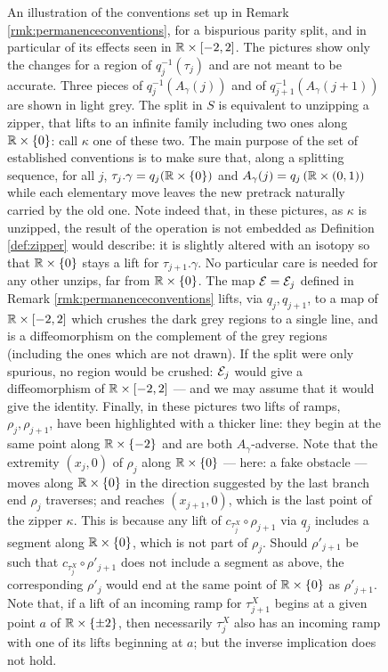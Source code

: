 \begin{rmk}
\begin{figure}
\centering
\def\svgwidth{\textwidth}

\caption{\label{fig:permanenceconventions} An illustration of the conventions set up in Remark \ref{rmk:permanenceconventions}, for a bispurious parity split, and in particular of its effects seen in $\mathbb R\times[-2,2]$. The pictures show only the changes for a region of $q_j^{-1}(\tau_j)$ and are not meant to be accurate. Three pieces of $q_j^{-1}(A_\gamma(j))$ and of $q_{j+1}^{-1}(A_\gamma(j+1))$ are shown in light grey. The split in $S$ is equivalent to unzipping a zipper, that lifts to an infinite family including two ones along $\mathbb R\times\{0\}$: call $\kappa$ one of these two. The main purpose of the set of established conventions is to make sure that, along a splitting sequence, for all $j$, $\tau_j.\gamma=q_j(\mathbb R\times\{0\})$ and $A_\gamma(j)=q_j\left(\mathbb R\times(0,1)\right)$ while each elementary move leaves the new pretrack naturally carried by the old one. Note indeed that, in these pictures, as $\kappa$ is unzipped, the result of the operation is not embedded as Definition \ref{def:zipper} would describe: it is slightly altered with an isotopy so that $\mathbb R\times\{0\}$ stays a lift for $\tau_{j+1}.\gamma$. No particular care is needed for any other unzips, far from $\mathbb R\times\{0\}$. The map $\mathcal{E}=\mathcal{E}_j$ defined in Remark \ref{rmk:permanenceconventions} lifts, via $q_j,q_{j+1}$, to a map of $\mathbb R\times[-2,2]$ which crushes the dark grey regions to a single line, and is a diffeomorphism on the complement of the grey regions (including the ones which are not drawn). If the split were only spurious, no region would be crushed: $\mathcal{E}_j$ would give a diffeomorphism of $\mathbb R\times[-2,2]$ --- and we may assume that it would give the identity. Finally, in these pictures two lifts of ramps, $\rho_j,\rho_{j+1}$, have been highlighted with a thicker line: they begin at the same point along $\mathbb R\times\{-2\}$ and are both $A_\gamma$-adverse. Note that the extremity $(x_j,0)$ of $\rho_j$ along $\mathbb R\times\{0\}$ --- here: a fake obstacle --- moves along $\mathbb R\times\{0\}$ in the direction suggested by the last branch end $\rho_j$ traverses; and reaches $(x_{j+1},0)$, which is the last point of the zipper $\kappa$. This is because any lift of $c_{\tau_j^X}\circ\rho_{j+1}$ via $q_j$ includes a segment along $\mathbb R\times\{0\}$, which is not part of $\rho_j$. Should $\rho'_{j+1}$ be such that $c_{\tau_j^X}\circ\rho'_{j+1}$ does not include a segment as above, the corresponding $\rho'_j$ would end at the same point of $\mathbb R\times\{0\}$ as $\rho'_{j+1}$. Note that, if a lift of an incoming ramp for $\tau_{j+1}^X$ begins at a given point $a$ of $\mathbb R\times\{\pm 2\}$, then necessarily $\tau_j^X$ also has an incoming ramp with one of its lifts beginning at $a$; but the inverse implication does not hold.
}
\end{figure}


\end{rmk}
